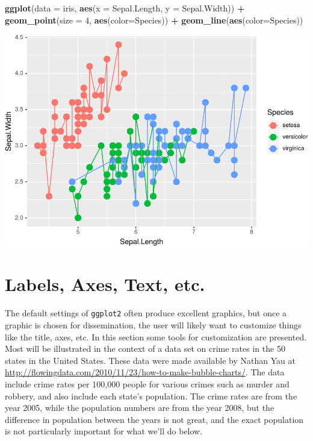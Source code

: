 \documentclass[]{krantz}
\makeatletter
\newenvironment{Shaded}{\begin{snugshade}}{\end{snugshade}}
\newcommand{\DataTypeTok}[1]{\textcolor[rgb]{0.27,0.27,0.27}{#1}}
\newcommand{\DecValTok}[1]{\textcolor[rgb]{0.06,0.06,0.06}{#1}}
\newcommand{\KeywordTok}[1]{\textcolor[rgb]{0.27,0.27,0.27}{\textbf{#1}}}
\newcommand{\NormalTok}[1]{#1}
\newcommand{\OperatorTok}[1]{\textcolor[rgb]{0.43,0.43,0.43}{\textbf{#1}}}
\newcommand{\StringTok}[1]{\textcolor[rgb]{0.5,0.5,0.5}{#1}}
\newenvironment{kframe}{%
\medskip{}
\setlength{\fboxsep}{.8em}
 \def\at@end@of@kframe{}%
 \ifinner\ifhmode%
  \def\at@end@of@kframe{\end{minipage}}%
  \begin{minipage}{\columnwidth}%
 \fi\fi%
 \def\FrameCommand##1{\hskip\@totalleftmargin \hskip-\fboxsep
 \colorbox{shadecolor}{##1}\hskip-\fboxsep
     \hskip-\linewidth \hskip-\@totalleftmargin \hskip\columnwidth}%
 \MakeFramed {\advance\hsize-\width
   \@totalleftmargin\z@ \linewidth\hsize
   \@setminipage}}%
 {\par\unskip\endMakeFramed%
 \at@end@of@kframe}
\renewenvironment{Shaded}{\begin{kframe}}{\end{kframe}}
\makeatother
\begin{document}
\begin{Shaded}
\begin{Highlighting}[]
\KeywordTok{ggplot}\NormalTok{(}\DataTypeTok{data =}\NormalTok{ iris, }\KeywordTok{aes}\NormalTok{(}\DataTypeTok{x =}\NormalTok{ Sepal.Length, }\DataTypeTok{y =}\NormalTok{ Sepal.Width)) }\OperatorTok{+}\StringTok{ }
\StringTok{    }\KeywordTok{geom_point}\NormalTok{(}\DataTypeTok{size =} \DecValTok{4}\NormalTok{, }\KeywordTok{aes}\NormalTok{(}\DataTypeTok{color=}\NormalTok{Species)) }\OperatorTok{+}\StringTok{ }
\StringTok{    }\KeywordTok{geom_line}\NormalTok{(}\KeywordTok{aes}\NormalTok{(}\DataTypeTok{color=}\NormalTok{Species))}
\end{Highlighting}
\end{Shaded}

\includegraphics{bookdown_files/figure-latex/unnamed-chunk-66-1.pdf}

\hypertarget{labels-axes-text-etc.}{%
\section{Labels, Axes, Text, etc.}\label{labels-axes-text-etc.}}

The default settings of \texttt{ggplot2} often produce excellent graphics, but once a graphic is chosen for dissemination, the user will likely want to customize things like the title, axes, etc. In this section some tools for customization are presented. Most will be illustrated in the context of a data set on crime rates in the 50 states in the United States. These data were made available by Nathan Yau at \url{http://flowingdata.com/2010/11/23/how-to-make-bubble-charts/}. The data include crime rates per 100,000 people for various crimes such as murder and robbery, and also include each state's population. The crime rates are from the year 2005, while the population numbers are from the year 2008, but the difference in population between the years is not great, and the exact population is not particularly important for what we'll do below.
\end{document}
